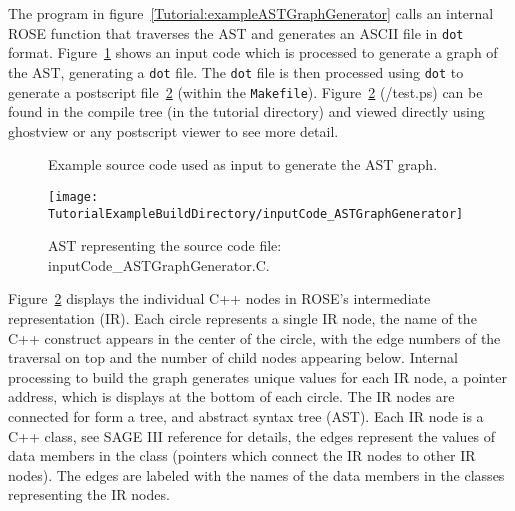 The program in figure~\ref{Tutorial:exampleASTGraphGenerator} calls 
an internal ROSE function that traverses the AST and generates 
an ASCII file in {\tt dot} format.
Figure~\ref{Tutorial:exampleInputCode_ASTGraphGenerator} shows an input
code which is processed to generate a graph of the AST, generating a 
{\tt dot} file.   The {\tt dot} file is then processed
using {\tt dot} to generate a postscript file~\ref{tutorial:exampleOutputCodeGraph}
(within the {\tt Makefile}).
Figure~\ref{tutorial:exampleOutputCodeGraph}
(\TutorialExampleBuildDirectory/test.ps) can be found in the compile 
tree (in the tutorial directory) and viewed directly using ghostview 
or any postscript viewer to see more detail.


\begin{figure}[!h]
{\indent
{\mySmallFontSize

\begin{latexonly}
   
\end{latexonly}

\begin{htmlonly}
   
\end{htmlonly}

}
}
\caption{Example source code used as input to generate the AST graph.}
\label{Tutorial:exampleInputCode_ASTGraphGenerator}
\end{figure}

\begin{figure}
\texttt{[image: \\TutorialExampleBuildDirectory/inputCode\_ASTGraphGenerator]}
\caption{AST representing the source code file: inputCode\_ASTGraphGenerator.C.}
\label{tutorial:exampleOutputCodeGraph}
\end{figure}

   Figure~\ref{tutorial:exampleOutputCodeGraph} displays the individual
C++ nodes in ROSE's intermediate representation (IR).  Each circle represents
a single IR node, the name of the C++ construct appears in the center of the
circle, with the edge numbers of the traversal on top and the number of
child nodes appearing below.  Internal processing to build the graph generates
unique values for each IR node, a pointer address, which is displays at the bottom
of each circle.  The IR nodes are connected for form a tree, and abstract syntax
tree (AST). Each IR node is a C++ class, see SAGE III reference for details,
the edges represent the values of data members in the class (pointers which connect
the IR nodes to other IR nodes).  The edges are labeled with the names of the 
data members in the classes representing the IR nodes.

